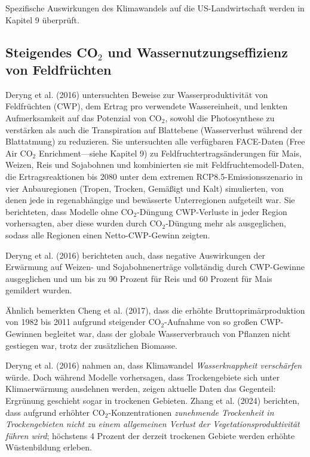 \documentclass[12pt,paper=a4,DIV=12,parskip=never,chapterprefix=false,headings=standardclasses]{scrreprt}
\begin{document}
Spezifische Auswirkungen des Klimawandels auf die US-Landwirtschaft werden in Kapitel 9 überprüft.

\subsection{Steigendes CO$_2$ und Wassernutzungseffizienz von Feldfrüchten}

Deryng et al. (2016) untersuchten Beweise zur Wasserproduktivität von Feldfrüchten (CWP), dem Ertrag pro verwendete Wassereinheit, und lenkten Aufmerksamkeit auf das Potenzial von CO$_2$, sowohl die Photosynthese zu verstärken als auch die Transpiration auf Blattebene (Wasserverlust während der Blattatmung) zu reduzieren. Sie untersuchten alle verfügbaren FACE-Daten (Free Air CO$_2$ Enrichment—siehe Kapitel 9) zu Feldfruchtertragsänderungen für Mais, Weizen, Reis und Sojabohnen und kombinierten sie mit Feldfruchtemodell-Daten, die Ertragsreaktionen bis 2080 unter dem extremen RCP8.5-Emissionsszenario in vier Anbauregionen (Tropen, Trocken, Gemäßigt und Kalt) simulierten, von denen jede in regenabhängige und bewässerte Unterregionen aufgeteilt war. Sie berichteten, dass Modelle ohne CO$_2$-Düngung CWP-Verluste in jeder Region vorhersagten, aber diese wurden durch CO$_2$-Düngung mehr als ausgeglichen, sodass alle Regionen einen Netto-CWP-Gewinn zeigten.

Deryng et al. (2016) berichteten auch, dass negative Auswirkungen der Erwärmung auf Weizen- und Sojabohnenerträge vollständig durch CWP-Gewinne ausgeglichen und um bis zu 90 Prozent für Reis und 60 Prozent für Mais gemildert wurden.

Ähnlich bemerkten Cheng et al. (2017), dass die erhöhte Bruttoprimärproduktion von 1982 bis 2011 aufgrund steigender CO$_2$-Aufnahme von so großen CWP-Gewinnen begleitet war, dass der globale Wasserverbrauch von Pflanzen nicht gestiegen war, trotz der zusätzlichen Biomasse.

Deryng et al. (2016) nahmen an, dass Klimawandel \emph{Wasserknappheit verschärfen} würde. Doch während Modelle vorhersagen, dass Trockengebiete sich unter Klimaerwärmung ausdehnen werden, zeigen aktuelle Daten das Gegenteil: Ergrünung geschieht sogar in trockenen Gebieten. Zhang et al. (2024) berichten, dass aufgrund erhöhter CO$_2$-Konzentrationen \emph{zunehmende Trockenheit in Trockengebieten nicht zu einem allgemeinen Verlust der Vegetationsproduktivität führen wird}; höchstens 4 Prozent der derzeit trockenen Gebiete werden erhöhte Wüstenbildung erleben.
\end{document}
